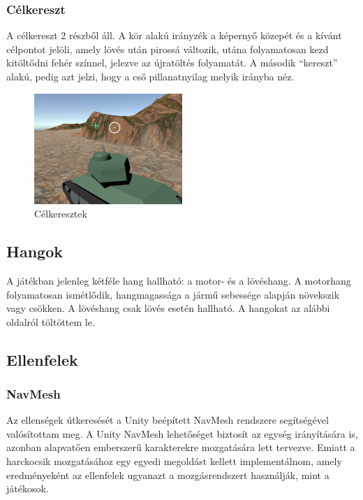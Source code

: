 \documentclass[
]{thesis-ekf}
\theoremstyle{definition}
\theoremstyle{remark}
\begin{document}
\subsubsection{Célkereszt}

A célkereszt 2 részből áll. A kör alakú irányzék a képernyő közepét és a kívánt célpontot jelöli, amely lövés után pirossá változik, utána folyamatosan kezd kitöltődni fehér színnel, jelezve az újratöltés folyamatát. A második ``kereszt'' alakú, pedig azt jelzi, hogy a cső pillanatnyilag melyik irányba néz.

\begin{figure}[H]
    \centering
    \includegraphics[width=0.5\textwidth]{screenshots/crosshair.png}
    \caption{Célkeresztek}
    \label{fig:crosshair}
\end{figure}

\subsection{Hangok}

A játékban jelenleg kétféle hang hallható: a motor- és a lövéshang. A motorhang folyamatosan ismétlődik, hangmagassága a jármű sebessége alapján növekszik vagy csökken. A lövéshang csak lövés esetén hallható. A hangokat az alábbi oldalról\cite{freesound} töltöttem le.

\subsection{Ellenfelek}

\subsubsection{NavMesh}

Az ellenségek útkeresését a Unity beépített NavMesh rendszere segítségével valósítottam meg. A Unity NavMesh lehetőséget biztosít az egység irányítására is, azonban alapvatően emberszerű karakterekre mozgatására lett tervezve. Emiatt a harckocsik mozgatásához egy egyedi megoldást kellett implementálnom, amely eredményeként az ellenfelek ugyanazt a mozgásrendszert használják, mint a játékosok.
\end{document}
